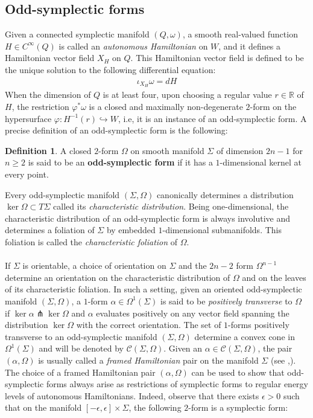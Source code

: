 \documentclass[11pt]{amsart}
\theoremstyle{plain}
\theoremstyle{definition}
\newtheorem{definition}[theorem]{Definition}
\theoremstyle{remark}
\begin{document}
\subsection{Odd-symplectic forms}
Given a connected symplectic manifold $(Q,\omega)$, a smooth real-valued function $H \in C^{\infty}(Q)$ is called an \emph{autonomous Hamiltonian} on $W$, and it defines a Hamiltonian vector field $X_H$ on $Q$. This Hamiltonian vector field is defined to be the unique solution to the following differential equation:
\begin{align}
    \iota_{X_H}\omega =dH
\end{align}
When the dimension of $Q$ is at least four, upon choosing a regular value $r \in \mathbb{R}$ of $H$, the restriction $\varphi^*\omega$ is a closed and maximally non-degenerate $2$-form on the hypersurface $\varphi:H^{-1}(r) \hookrightarrow W$, i.e, it is an instance of an odd-symplectic form. A precise definition of an odd-symplectic form is the following:
\begin{definition}\label{odd-sympelctic_form_def}
    A closed $2$-form $\Omega$ on smooth manifold $\Sigma$ of dimension $2n-1$ for $n\geq 2$ is said to be an {\bf odd-symplectic form} if it has a $1$-dimensional kernel at every point. 
\end{definition}
Every odd-symplectic manifold $(\Sigma,\Omega)$ canonically determines a distribution $\ker\Omega \subset T\Sigma$ called its \emph{characteristic distribution}. Being one-dimensional, the characteristic distribution of an odd-symplectic form is always involutive and determines a foliation of $\Sigma$ by embedded $1$-dimensional submanifolds. This foliation is called the \emph{characteristic foliation} of $\Omega$.\\
\\
If $\Sigma$ is orientable, a choice of orientation on $\Sigma$ and the $2n-2$ form $\Omega^{n-1}$ determine an orientation on the characteristic distribution of $\Omega$ and on the leaves of its characteristic foliation. In such a setting, given an oriented odd-symplectic manifold $(\Sigma,\Omega)$, a $1$-form $\alpha \in \Omega^1(\Sigma)$ is said to be \emph{positively transverse} to $\Omega$ if $\ker\alpha \pitchfork \ker\Omega$ and $\alpha$ evaluates positively on any vector field spanning the distribution $\ker\Omega$ with the correct orientation. The set of $1$-forms positively transverse to an odd-symplectic manifold $(\Sigma,\Omega)$ determine a convex cone in $\Omega^1(\Sigma)$ and will be denoted by $\mathcal{C}(\Sigma,\Omega)$. Given an $\alpha \in \mathcal{C}(\Sigma,\Omega)$, the pair $(\alpha,\Omega)$ is usually called a \emph{framed Hamiltonian} pair on the manifold $\Sigma$ (see \cite{Fish-Hofer},\cite{rohil}). The choice of a framed Hamiltonian pair $(\alpha,\Omega)$ can be used to show that odd-symplectic forms always arise as restrictions of symplectic forms to regular energy levels of autonomous Hamiltonians. Indeed, observe that there exists $\epsilon>0$ such that on the manifold $[-\epsilon,\epsilon] \times \Sigma$, the following $2$-form is a symplectic form: 
\end{document}
